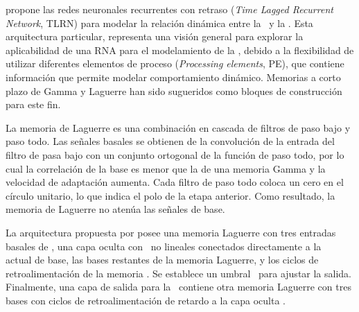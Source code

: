 \cite{Panerai2004} propone las redes neuronales recurrentes con retraso ({\em Time Lagged Recurrent Network}, TLRN) para modelar la relación dinámica entre la \pam\, y la \cbfv. Esta arquitectura particular, representa una visión general para explorar la aplicabilidad de una RNA para el modelamiento de la \cbf, debido a la flexibilidad de utilizar diferentes elementos de proceso ({\em Processing elements}, PE), que contiene información que permite modelar comportamiento dinámico. Memorias a corto plazo de Gamma y Laguerre han sido sugueridos como bloques de construcción para este fin. %

La memoria de Laguerre es una combinación en cascada de filtros de paso bajo y paso todo. Las señales basales se obtienen de la convolución de la entrada del filtro de pasa bajo con un conjunto ortogonal de la función de paso todo, por lo cual la correlación de la base es menor que la de una memoria Gamma y la velocidad de adaptación aumenta. Cada filtro de paso todo coloca un cero en el círculo unitario, lo que indica el polo de la etapa anterior. Como resultado, la memoria de Laguerre no atenúa las señales de base.

La arquitectura propuesta por \cite{Panerai2004} posee una memoria Laguerre con tres entradas basales de \abp, una capa oculta con \pe\, no lineales conectados directamente a la \abp\, actual de base, las bases restantes de la memoria Laguerre, y los ciclos de retroalimentación de la memoria \cbfv. Se establece un umbral \pe\, para ajustar la salida. Finalmente, una capa de salida para la \cbfv\, contiene otra memoria Laguerre con tres bases con ciclos de retroalimentación de retardo a la capa oculta \pe.


